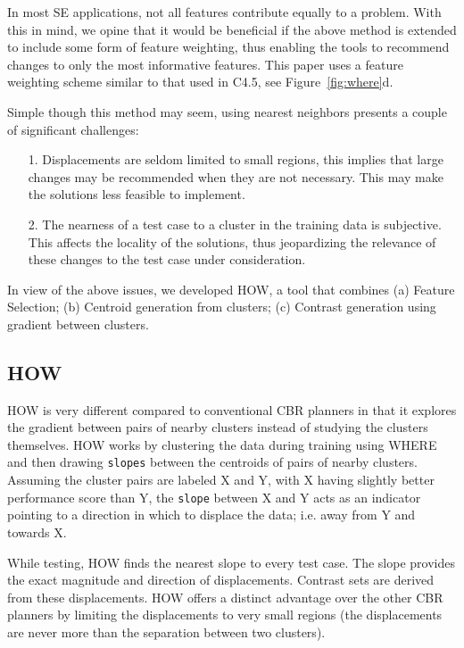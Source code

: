 \documentclass{sig-alternate}
\newcommand{\fig}[1]{Figure~\ref{fig:#1}}
\begin{document}
In most SE applications, not all features contribute equally to a problem. With this in mind, we opine that it would be beneficial if the above method is extended to include some form of feature weighting, thus enabling the tools to recommend changes to only the most informative features. This paper uses a feature weighting scheme similar to that used in C4.5, see \fig{where}d.

Simple though this method may seem, using nearest neighbors presents a couple of significant challenges: 
\begin{itemize}
\item[1.] Displacements are seldom limited to small regions, this implies that large changes may be recommended when they are not necessary. This may make the solutions less feasible to implement. 
\item[2.] The nearness of a test case to a cluster in the training data is subjective. This affects the locality of the solutions, thus jeopardizing the relevance of these changes to the test case under consideration.
\end{itemize}

In view of the above issues, we developed HOW, a tool that combines (a) Feature Selection; (b) Centroid generation from clusters; (c) Contrast generation using gradient between clusters.


\subsection{HOW}

HOW is very different compared to conventional CBR planners in that it explores the gradient between pairs of nearby clusters instead of studying the clusters themselves. HOW works by clustering the data during training using WHERE and then drawing \texttt{slopes} between the centroids of pairs of nearby clusters. Assuming the cluster pairs are labeled X and Y, with X having slightly better performance score than Y, the \texttt{slope} between X and Y acts as an indicator pointing to a direction in which to displace the data; i.e. away from Y and towards X. 

While testing, HOW finds the nearest slope to every test case. The slope provides the exact magnitude and direction of displacements. Contrast sets are derived from these displacements. HOW offers a distinct advantage over the other CBR planners by limiting the displacements to very small regions (the displacements are never more than the separation between two clusters). 
\end{document}
